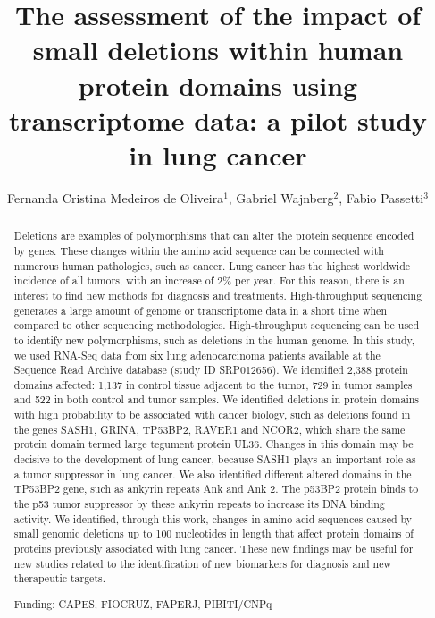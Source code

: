 \documentclass[twoside]{article}
\title{\vspace{-15mm}\fontsize{24pt}{10pt}\selectfont\textbf{The assessment of the impact of small deletions within human protein domains using transcriptome data: a pilot study in lung cancer}} %
\author{Fernanda Cristina Medeiros de Oliveira$^1$, Gabriel Wajnberg$^2$, Fabio Passetti$^3$}
\affil{1 FIOCRUZ-IOC\\ 2 FIOCRUZ - IOC\\ }
\date{}
\begin{document}
\maketitle %

\thispagestyle{fancy} %


\begin{abstract}
Deletions are examples of polymorphisms that can alter the protein sequence encoded by genes. These changes within the amino acid sequence can be connected with numerous human pathologies, such as cancer. Lung cancer has the highest worldwide incidence of all tumors, with an increase of 2\% per year. For this reason, there is an interest to find new methods for diagnosis and treatments. High-throughput sequencing generates a large amount of genome or transcriptome data in a short time when compared to other sequencing methodologies. High-throughput sequencing can be used to identify new polymorphisms, such as deletions in the human genome. In this study, we used RNA-Seq data from six lung adenocarcinoma patients available at the Sequence Read Archive database (study ID SRP012656). We identified 2,388 protein domains affected: 1,137 in control tissue adjacent to the tumor, 729 in tumor samples and 522 in both control and tumor samples. We identified deletions in protein domains with high probability to be associated with cancer biology, such as deletions found in the genes SASH1, GRINA, TP53BP2, RAVER1 and NCOR2, which share the same protein domain termed large tegument protein UL36. Changes in this domain may be decisive to the development of lung cancer, because SASH1 plays an important role as a tumor suppressor in lung cancer. We also identified different altered domains in the TP53BP2 gene, such as ankyrin repeats Ank and Ank 2. The p53BP2 protein binds to the p53 tumor suppressor by these ankyrin repeats to increase its DNA binding activity. We identified, through this work, changes in amino acid sequences caused by small genomic deletions up to 100 nucleotides in length that affect protein domains of proteins previously associated with lung cancer. These new findings may be useful for new studies related to the identification of new biomarkers for diagnosis and new therapeutic targets.

Funding: CAPES, FIOCRUZ, FAPERJ, PIBITI/CNPq
\end{abstract}
\end{document}
